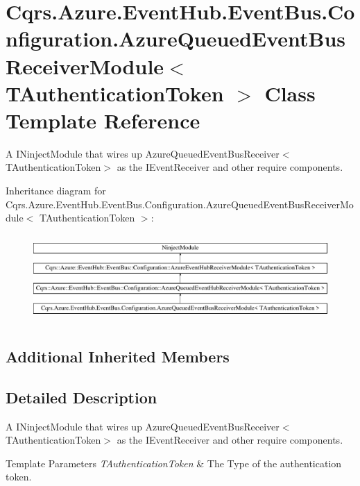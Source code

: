\hypertarget{classCqrs_1_1Azure_1_1EventHub_1_1EventBus_1_1Configuration_1_1AzureQueuedEventBusReceiverModule}{}\section{Cqrs.\+Azure.\+Event\+Hub.\+Event\+Bus.\+Configuration.\+Azure\+Queued\+Event\+Bus\+Receiver\+Module$<$ T\+Authentication\+Token $>$ Class Template Reference}
\label{classCqrs_1_1Azure_1_1EventHub_1_1EventBus_1_1Configuration_1_1AzureQueuedEventBusReceiverModule}


A I\+Ninject\+Module that wires up Azure\+Queued\+Event\+Bus\+Receiver$<$\+T\+Authentication\+Token$>$ as the I\+Event\+Receiver and other require components.  


Inheritance diagram for Cqrs.\+Azure.\+Event\+Hub.\+Event\+Bus.\+Configuration.\+Azure\+Queued\+Event\+Bus\+Receiver\+Module$<$ T\+Authentication\+Token $>$\+:\begin{figure}[H]
\begin{center}
\leavevmode
\includegraphics[height=3.363364cm]{classCqrs_1_1Azure_1_1EventHub_1_1EventBus_1_1Configuration_1_1AzureQueuedEventBusReceiverModule}
\end{center}
\end{figure}
\subsection*{Additional Inherited Members}


\subsection{Detailed Description}
A I\+Ninject\+Module that wires up Azure\+Queued\+Event\+Bus\+Receiver$<$\+T\+Authentication\+Token$>$ as the I\+Event\+Receiver and other require components. 


\begin{DoxyTemplParams}{Template Parameters}
{\em T\+Authentication\+Token} & The Type of the authentication token.\\
\hline
\end{DoxyTemplParams}
